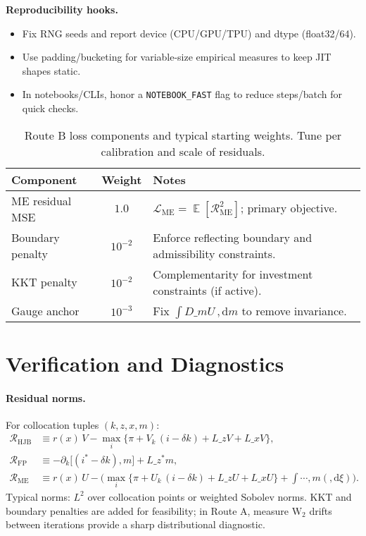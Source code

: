 ﻿\documentclass[11pt,letterpaper,oneside]{article}
\numberwithin{equation}{section}
\DeclareMathOperator{\E}{\mathbb{E}}
\newcommand{\1}{\mathbf{1}}
\newcommand{\diff}{,\mathrm{d}}
\newcommand{\Lz}{L\_z}
\newcommand{\Lx}{L\_x}
\newcommand{\Lzadj}{L\_z^{\!*}}
\newcommand{\dmU}{D\_m U}
\newcommand{\dxi}{, m(\diff \xi)}
\begin{document}
\begin{tcolorbox}[didacticstyle]
\begin{itemize}[leftmargin=1.1em,itemsep=0.25em]
\begin{tcolorbox}[didacticstyle]
\textbf{Reproducibility hooks.}
\begin{itemize}[leftmargin=1.1em,itemsep=0.25em]
  \item Fix RNG seeds and report device (CPU/GPU/TPU) and dtype (float32/64).
  \item Use padding/bucketing for variable-size empirical measures to keep JIT shapes static.
  \item In notebooks/CLIs, honor a \texttt{NOTEBOOK\_FAST} flag to reduce steps/batch for quick checks.
\end{itemize}
\end{tcolorbox}

\begin{table}[ht]
\centering
\small
\begin{tabular}{@{}lcl@{}}
\toprule
Component & Weight & Notes \\
\midrule
ME residual MSE & $1.0$ & $\mathcal{L}_{\mathrm{ME}}=\E[\mathcal{R}_{\mathrm{ME}}^2]$; primary objective. \\
Boundary penalty & $10^{-2}$ & Enforce reflecting boundary and admissibility constraints. \\
KKT penalty & $10^{-2}$ & Complementarity for investment constraints (if active). \\
Gauge anchor & $10^{-3}$ & Fix $\int \dmU\,\diff m$ to remove invariance. \\
\bottomrule
\end{tabular}
\caption{Route B loss components and typical starting weights. Tune per calibration and scale of residuals.}
\end{table}

\section{Verification and Diagnostics}\label{sec:verification}

\paragraph{Residual norms.}
For collocation tuples $(k,z,x,m)$:
\begin{align*}
\mathcal{R}_{\mathrm{HJB}} &\equiv r(x)\, V - \max_{i}\{\pi + V_k\,(i-\delta k) + \Lz V + \Lx V\},\\
\mathcal{R}_{\mathrm{FP}}  &\equiv -\partial_k\big[(i^*-\delta k),m\big] + \Lzadj m,\\
\mathcal{R}_{\mathrm{ME}}  &\equiv r(x)\,U - \Big(\max_{i}\{\pi + U_k\,(i-\delta k) + \Lz U + \Lx U\}
  + \int\cdots\dxi
  \Big).
\end{align*}
  Typical norms: $L^2$ over collocation points or weighted Sobolev norms. KKT and boundary penalties are added for feasibility; in Route A, measure $\mathrm{W}_2$ drifts between iterations provide a sharp distributional diagnostic.


\end{itemize}
\end{tcolorbox}
\end{document}
